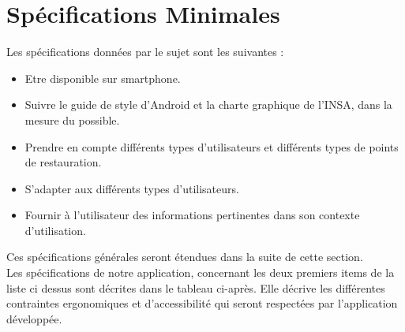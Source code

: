 \section{Spécifications Minimales}

    Les spécifications données par le sujet sont les suivantes : \\
    
\begin{itemize}
    \item[\textbullet] Etre disponible sur smartphone.
    \item[\textbullet] Suivre le guide de style d'Android et la charte graphique de l'INSA, dans la mesure du possible.
    \item[\textbullet] Prendre en compte différents types d'utilisateurs et différents types de points de restauration.
    \item[\textbullet] S'adapter aux différents types d'utilisateurs.
    \item[\textbullet] Fournir à l'utilisateur des informations pertinentes dans son contexte d'utilisation. \\
\end{itemize}

    Ces spécifications générales seront étendues dans la suite de cette section. \\
    
    Les spécifications de notre application, concernant les deux premiers items de la liste ci dessus sont décrites dans le tableau ci-après. Elle décrive les différentes contraintes ergonomiques et d'accessibilité qui seront respectées par l'application développée. 

